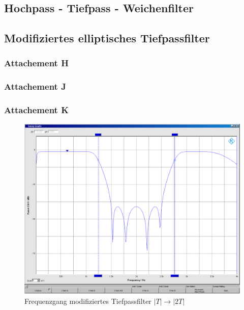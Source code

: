 \subsection{Hochpass - Tiefpass - Weichenfilter}

\subsection{Modifiziertes elliptisches Tiefpassfilter}
\subsubsection{Attachement H}

\subsubsection{Attachement J}

\subsubsection{Attachement K}

	\begin{figure}[h]
		\centering
		\includegraphics[width=0.7\linewidth]{Bilder/ellip2T}
		\caption{Frequenzgang modifiziertes Tiefpassfilter $|T| \rightarrow |2T|$}
		\label{fig:ellip2T}
	\end{figure}
